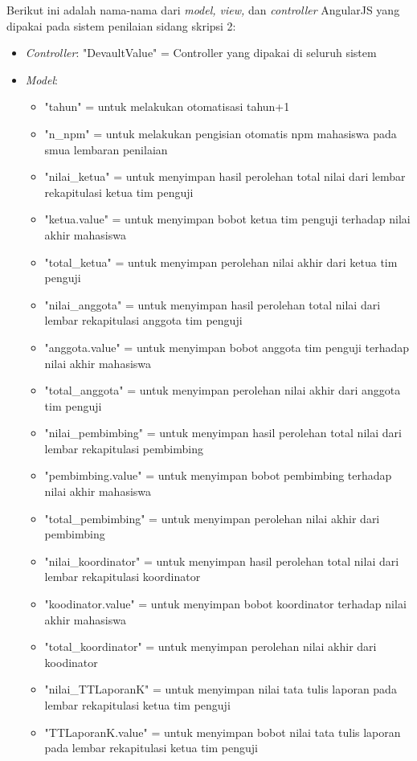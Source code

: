 	Berikut ini adalah nama-nama dari \textit{model, view,} dan \textit{controller} AngularJS yang dipakai pada sistem penilaian sidang skripsi 2:
	\begin{itemize}
		\item \textit{Controller}: "DevaultValue" = Controller yang dipakai di seluruh sistem
		\item \textit{Model}:
		\begin{itemize}
			\item "tahun" = untuk melakukan otomatisasi tahun+1
			\item "n\_npm" = untuk melakukan pengisian otomatis npm mahasiswa pada smua lembaran penilaian
			\item "nilai\_ketua" = untuk menyimpan hasil perolehan total nilai dari lembar rekapitulasi ketua tim penguji
			\item "ketua.value" = untuk menyimpan bobot ketua tim penguji terhadap nilai akhir mahasiswa
			\item "total\_ketua" = untuk menyimpan perolehan nilai akhir dari ketua tim penguji
			\item "nilai\_anggota" = untuk menyimpan hasil perolehan total nilai dari lembar rekapitulasi anggota tim penguji
			\item "anggota.value" = untuk menyimpan bobot anggota tim penguji terhadap nilai akhir mahasiswa
			\item "total\_anggota" = untuk menyimpan perolehan nilai akhir dari anggota tim penguji
			\item "nilai\_pembimbing" = untuk menyimpan hasil perolehan total nilai dari lembar rekapitulasi pembimbing
			\item "pembimbing.value" = untuk menyimpan bobot pembimbing terhadap nilai akhir mahasiswa
			\item "total\_pembimbing" = untuk menyimpan perolehan nilai akhir dari pembimbing
			\item "nilai\_koordinator" = untuk menyimpan hasil perolehan total nilai dari lembar rekapitulasi koordinator
			\item "koodinator.value" = untuk menyimpan bobot koordinator terhadap nilai akhir mahasiswa
			\item "total\_koordinator" = untuk menyimpan perolehan nilai akhir dari koodinator
			\item "nilai\_TTLaporanK" = untuk menyimpan nilai tata tulis laporan pada lembar rekapitulasi ketua tim penguji
			\item "TTLaporanK.value" = untuk menyimpan bobot nilai tata tulis laporan pada lembar rekapitulasi ketua tim penguji

\end{itemize}
\end{itemize}
